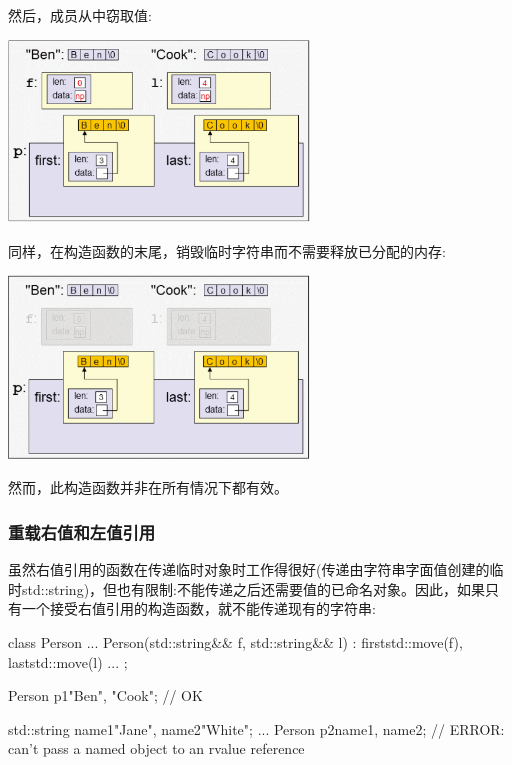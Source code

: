 然后，成员从中窃取值:

\begin{center}
	\includegraphics[width=0.6\textwidth]{part1/ch4/images/10}
\end{center}

同样，在构造函数的末尾，销毁临时字符串而不需要释放已分配的内存:

\begin{center}
	\includegraphics[width=0.6\textwidth]{part1/ch4/images/11}
\end{center}

然而，此构造函数并非在所有情况下都有效。

\subsubsection{重载右值和左值引用}

虽然右值引用的函数在传递临时对象时工作得很好(传递由字符串字面值创建的临时std::string)，但也有限制:不能传递之后还需要值的已命名对象。因此，如果只有一个接受右值引用的构造函数，就不能传递现有的字符串:

\begin{cppcode}
class Person {
	...
	Person(std::string&& f, std::string&& l)
	: first{std::move(f)}, last{std::move(l)} {
	}
	...
};

Person p1{"Ben", "Cook"}; // OK

std::string name1{"Jane"}, name2{"White"};
...
Person p2{name1, name2}; // ERROR: can’t pass a named object to an rvalue reference
\end{cppcode}

